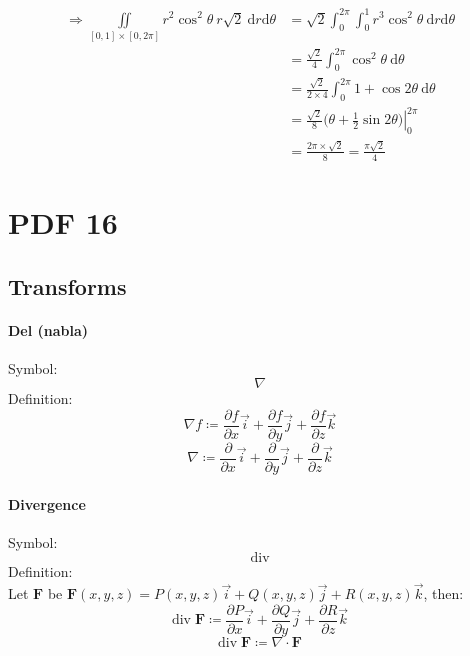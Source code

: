 \documentclass[12pt, fleqn]{book}
\begin{document}
 				\begin{equation*}
 					\begin{split}
	 					\Rightarrow \iint\limits_{[0, 1] \times [0, 2\pi]}
 						r^2\cos^2\theta \ r\sqrt{2} \ \mathrm{d}r \mathrm{d}\theta
 						 & = \sqrt{2} \int_{0}^{2\pi} \int_{0}^{1} r^3\cos^2\theta \ \mathrm{d}r \mathrm{d}\theta \\
 						 & = \frac{\sqrt{2}}{4} \int_{0}^{2\pi} \cos^2\theta \ \mathrm{d}\theta \\
 						 & = \frac{\sqrt{2}}{2 \times 4} \int_{0}^{2\pi} 1 + \cos2\theta \ \mathrm{d}\theta \\
 						 & = \frac{\sqrt{2}}{8} \left.\big(\theta + \frac{1}{2}\sin2\theta\big)\right|_0^{2\pi} \\
 						 & = \frac{2\pi \times \sqrt{2}}{8} = \frac{\pi\sqrt{2}}{4}
 					\end{split}
 				\end{equation*}
\chapter{PDF 16}\label{pdf16}
	\section{Transforms}
		\subsubsection{Del (nabla)}
			Symbol:
			\begin{equation}
				\nabla
			\end{equation}
			Definition:
			\begin{equation}
				\nabla f \coloneqq \frac{\partial f}{\partial x}\vec{i} + \frac{\partial f}{\partial y}\vec{j} + \frac{\partial f}{\partial z}\vec{k}
			\end{equation}
		    \begin{equation}
		    	\nabla \coloneqq \frac{\partial}{\partial x}\vec{i} + \frac{\partial}{\partial y}\vec{j} + \frac{\partial}{\partial z}\vec{k}
		    \end{equation}
	    \subsubsection{Divergence}
	    	Symbol:
	    	\begin{equation}
	    		\mathrm{div}
	    	\end{equation}
    		Definition: \\
    		Let $\mathbf{F}$ be $\mathbf{F}(x, y, z) = P(x, y, z)\vec{i} + Q(x, y, z)\vec{j} + R(x, y, z)\vec{k}$, then:
    		\begin{equation}
    			\mathrm{div} \; \mathbf{F} \coloneqq \frac{\partial P}{\partial x}\vec{i} + \frac{\partial Q}{\partial y}\vec{j} + \frac{\partial R}{\partial z}\vec{k}
    		\end{equation}
    		\begin{equation}
    			\mathrm{div} \; \mathbf{F} \coloneqq \nabla \cdot \mathbf{F}
    		\end{equation}
\end{document}
